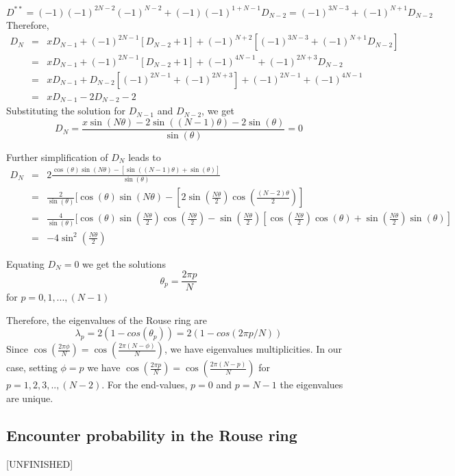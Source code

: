 \documentclass{paper}
\begin{document}
\begin{equation*}
D^{**}=(-1)(-1)^{2N-2}(-1)^{N-2} +(-1)(-1)^{1+N-1}D_{N-2}=(-1)^{3N-3}+(-1)^{N+1}D_{N-2}
\end{equation*}
Therefore, 
\begin{eqnarray*}
D_N & = & xD_{N-1} + (-1)^{2N-1}[D_{N-2}+1]+(-1)^{N+2}[(-1)^{3N-3}+(-1)^{N+1}D_{N-2}]\\
    & = & xD_{N-1} + (-1)^{2N-1}[D_{N-2}+1]+(-1)^{4N-1}+(-1)^{2N+3}D_{N-2}\\
    & = & xD_{N-1} + D_{N-2}[(-1)^{2N-1}+(-1)^{2N+3}]+(-1)^{2N-1}+(-1)^{4N-1}\\
    & = & xD_{N-1} - 2D_{N-2}-2
\end{eqnarray*}
Substituting the solution for $D_{N-1}$ and $D_{N-2}$, we get 
\begin{equation*}
D_N = \frac{x\sin(N\theta)-2\sin((N-1)\theta)-2\sin(\theta)}{\sin(\theta)}=0
\end{equation*}

Further simplification of $D_N$ leads to 
\begin{eqnarray*}
D_N &=& 2\frac{\cos(\theta)\sin(N\theta)-[\sin((N-1)\theta)+\sin(\theta)]}{\sin(\theta)}\\
    &=& \frac{2}{\sin(\theta)}[\cos(\theta)\sin(N\theta)-[2\sin(\frac{N\theta}{2})\cos(\frac{(N-2)\theta}{2})]\\
    &=& \frac{4}{\sin(\theta)}[\cos(\theta)\sin(\frac{N\theta}{2})\cos(\frac{N\theta}{2})-\sin(\frac{N\theta}{2})[\cos(\frac{N\theta}{2})\cos(\theta)+\sin(\frac{N\theta}{2})\sin(\theta)]\\
    &=& -4\sin^2(\frac{N\theta}{2})
\end{eqnarray*}

Equating $D_N=0$ we get the solutions
\begin{equation*}
\theta_p=\frac{2\pi p}{N}
\end{equation*}
for $p=0,1,...,(N-1)$

Therefore, the eigenvalues of the Rouse ring are 
\begin{equation*}
\lambda_p=2(1-cos(\theta_p))= 2(1-cos(2\pi p/N))
\end{equation*}
Since $\cos(\frac{2\pi \phi}{N})=\cos(\frac{2\pi(N-\phi)}{N})$, we have eigenvalues multiplicities. In our case, setting $\phi=p$ we have $\cos(\frac{2\pi p}{N})=\cos(\frac{2\pi(N-p)}{N})$ for $p=1,2,3,..,(N-2)$. For the end-values, $p=0$ and $p=N-1$ the eigenvalues are unique. 

\subsection{Encounter probability in the Rouse ring}\label{subsection_encounterProbabilityInTheRouseRing}
[UNFINISHED]
\end{document}

